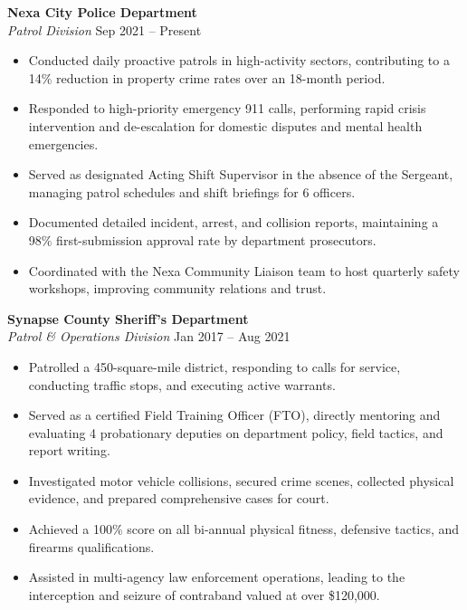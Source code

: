 \documentclass[10pt]{article}
\begin{document}
 \hfill {\bfseries Nexa City Police Department} \\
{\color{accentcolor}\itshape Patrol Division} \hfill {\color{darkgray}\small Sep 2021 -- Present}
\begin{itemize}[leftmargin=1.5em, topsep=2pt, itemsep=2pt, parsep=0pt]
    \item Conducted daily proactive patrols in high-activity sectors, contributing to a 14\% reduction in property crime rates over an 18-month period.
    \item Responded to high-priority emergency 911 calls, performing rapid crisis intervention and de-escalation for domestic disputes and mental health emergencies.
    \item Served as designated Acting Shift Supervisor in the absence of the Sergeant, managing patrol schedules and shift briefings for 6 officers.
    \item Documented detailed incident, arrest, and collision reports, maintaining a 98\% first-submission approval rate by department prosecutors.
    \item Coordinated with the Nexa Community Liaison team to host quarterly safety workshops, improving community relations and trust.
\end{itemize}

\vspace{0.5em}

 \hfill {\bfseries Synapse County Sheriff's Department} \\
{\color{accentcolor}\itshape Patrol \& Operations Division} \hfill {\color{darkgray}\small Jan 2017 -- Aug 2021}
\begin{itemize}[leftmargin=1.5em, topsep=2pt, itemsep=2pt, parsep=0pt]
    \item Patrolled a 450-square-mile district, responding to calls for service, conducting traffic stops, and executing active warrants.
    \item Served as a certified Field Training Officer (FTO), directly mentoring and evaluating 4 probationary deputies on department policy, field tactics, and report writing.
    \item Investigated motor vehicle collisions, secured crime scenes, collected physical evidence, and prepared comprehensive cases for court.
    \item Achieved a 100\% score on all bi-annual physical fitness, defensive tactics, and firearms qualifications.
    \item Assisted in multi-agency law enforcement operations, leading to the interception and seizure of contraband valued at over \$120,000.
\end{itemize}
\end{document}
